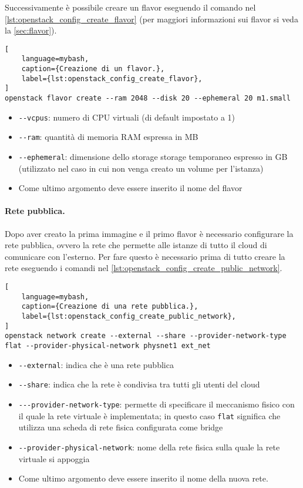 \medskip\noindent
Successivamente è possibile creare un flavor eseguendo il comando nel \cref{lst:openstack_config_create_flavor} (per maggiori informazioni sui flavor si veda la \cref{sec:flavor}).

\begin{lstlisting}[
    language=mybash, 
    caption={Creazione di un flavor.},
    label={lst:openstack_config_create_flavor},
]
openstack flavor create --ram 2048 --disk 20 --ephemeral 20 m1.small
\end{lstlisting}
\begin{itemize}
    \item \verb|--vcpus|: numero di CPU virtuali (di default impostato a 1)
    \item \verb|--ram|: quantità di memoria RAM espressa in MB
    \item \verb|--ephemeral|: dimensione dello storage storage temporaneo espresso in GB (utilizzato nel caso in cui non venga creato un volume per l'istanza)
    \item Come ultimo argomento deve essere inserito il nome del flavor
\end{itemize}


\paragraph{Rete pubblica.}
Dopo aver creato la prima immagine e il primo flavor è necessario configurare la rete pubblica, ovvero la rete che permette alle istanze di tutto il cloud di comunicare con l'esterno. Per fare questo è necessario prima di tutto creare la rete eseguendo i comandi nel \cref{lst:openstack_config_create_public_network}.

\begin{lstlisting}[
    language=mybash, 
    caption={Creazione di una rete pubblica.},
    label={lst:openstack_config_create_public_network},
]
openstack network create --external --share --provider-network-type flat --provider-physical-network physnet1 ext_net
\end{lstlisting}

\begin{itemize}
    \item \verb|--external|: indica che è una rete pubblica
    \item \verb|--share|: indica che la rete è condivisa tra tutti gli utenti del cloud
    \item \verb|---provider-network-type|: permette di specificare il meccanismo fisico con il quale la rete virtuale è implementata; in questo caso \verb|flat| significa che utilizza una scheda di rete fisica configurata come bridge
    \item \verb|--provider-physical-network|: nome della rete fisica sulla quale la rete virtuale si appoggia
    \item Come ultimo argomento deve essere inserito il nome della nuova rete.
\end{itemize}

